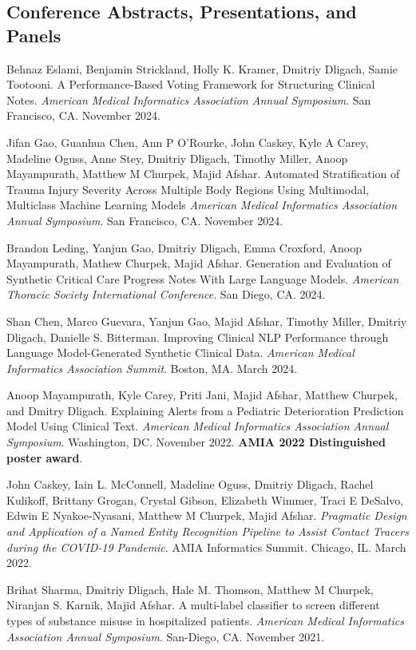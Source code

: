 \documentclass[letterpaper]{article}
\renewenvironment{itemize}{
  \begin{list}{}{
    \setlength{\leftmargin}{1.5em}
  }
}{
  \end{list}
}
\begin{document}
\subsection*{Conference Abstracts, Presentations, and Panels}
\begin{itemize}
\item Behnaz Eslami, Benjamin Strickland, Holly K. Kramer, Dmitriy Dligach, Samie Tootooni. A Performance-Based Voting Framework for Structuring Clinical Notes. \emph{American Medical Informatics Association Annual Symposium}. San Francisco, CA. November 2024.
\item Jifan Gao, Guanhua Chen, Ann P O’Rourke, John Caskey, Kyle A Carey, Madeline Oguss, Anne Stey, Dmitriy Dligach, Timothy Miller, Anoop Mayampurath, Matthew M Churpek, Majid Afshar. Automated Stratification of Trauma Injury Severity Across Multiple Body Regions Using Multimodal, Multiclass Machine Learning Models \emph{American Medical Informatics Association Annual Symposium}. San Francisco, CA. November 2024.
\item Brandon Leding, Yanjun Gao, Dmitriy Dligach, Emma Croxford, Anoop Mayampurath, Mathew Churpek, Majid Afshar. Generation and Evaluation of Synthetic Critical Care Progress Notes With Large Language Models. \emph{American Thoracic Society International Conference}. San Diego, CA. 2024.
\item Shan Chen, Marco Guevara, Yanjun Gao, Majid Afshar, Timothy Miller, Dmitriy Dligach, Danielle S. Bitterman. Improving Clinical NLP Performance through Language Model-Generated Synthetic Clinical Data. \emph{American Medical Informatics Association Summit}. Boston, MA. March 2024.
\item Anoop Mayampurath, Kyle Carey, Priti Jani, Majid Afshar, Matthew Churpek, and Dmitry Dligach. Explaining Alerts from a Pediatric Deterioration Prediction Model Using Clinical Text. \emph{American Medical Informatics Association Annual Symposium}. Washington, DC. November 2022. \textbf{AMIA 2022 Distinguished poster award}.
\item John Caskey, Iain L. McConnell, Madeline Oguss, Dmitriy Dligach, Rachel Kulikoff,  Brittany Grogan, Crystal Gibson, Elizabeth Wimmer, Traci E DeSalvo, Edwin E Nyakoe-Nyasani, Matthew M Churpek, Majid Afshar. \emph{Pragmatic Design and Application of a Named Entity Recognition Pipeline to Assist Contact Tracers during the COVID-19 Pandemic}. AMIA Informatics Summit. Chicago, IL. March 2022.
\item Brihat Sharma, Dmitriy Dligach, Hale M. Thomson, Matthew M Churpek, Niranjan S. Karnik, Majid Afshar. A multi-label classifier to screen different types of substance misuse in hospitalized patients. \emph{American Medical Informatics Association Annual Symposium}. San-Diego, CA. November 2021.

\end{itemize}
\end{document}
